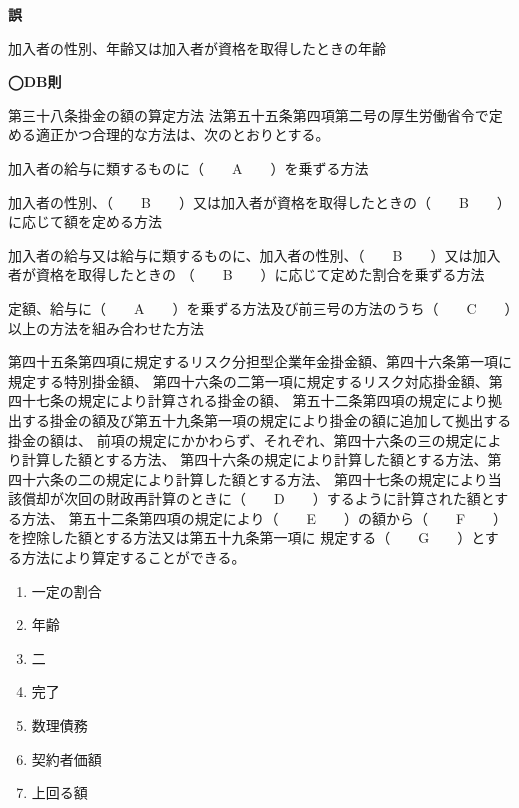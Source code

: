\begin{answerbox}
  \textbf{誤}

  加入者の性別、年齢又は加入者が資格を取得したときの年齢
\end{answerbox}

\begin{fillblank}[数理人試験 2022 問題1 設問2]
  \noindent \textbf{◯DB則}
  \begin{lawstructure}
    \begin{lawarticle}{第三十八条}{掛金の額の算定方法}
      法第五十五条第四項第二号の厚生労働省令で定める適正かつ合理的な方法は、次のとおりとする。

      加入者の給与に類するものに（　　A　　）を乗ずる方法

      加入者の性別、（　　B　　）又は加入者が資格を取得したときの（　　B　　）に応じて額を定める方法

      加入者の給与又は給与に類するものに、加入者の性別、（　　B　　）又は加入者が資格を取得したときの
      （　　B　　）に応じて定めた割合を乗ずる方法

      定額、給与に（　　A　　）を乗ずる方法及び前三号の方法のうち（　　C　　）以上の方法を組み合わせた方法

      第四十五条第四項に規定するリスク分担型企業年金掛金額、第四十六条第一項に規定する特別掛金額、
      第四十六条の二第一項に規定するリスク対応掛金額、第四十七条の規定により計算される掛金の額、
      第五十二条第四項の規定により拠出する掛金の額及び第五十九条第一項の規定により掛金の額に追加して拠出する掛金の額は、
      前項の規定にかかわらず、それぞれ、第四十六条の三の規定により計算した額とする方法、
      第四十六条の規定により計算した額とする方法、第四十六条の二の規定により計算した額とする方法、
      第四十七条の規定により当該償却が次回の財政再計算のときに（　　D　　）するように計算された額とする方法、
      第五十二条第四項の規定により（　　E　　）の額から（　　F　　）を控除した額とする方法又は第五十九条第一項に
      規定する（　　G　　）とする方法により算定することができる。
    \end{lawarticle}
  \end{lawstructure}
\end{fillblank}

\begin{answerbox}
  \begin{enumerate}[A: ]
    \item 一定の割合
    \item 年齢
    \item 二
    \item 完了
    \item 数理債務
    \item 契約者価額
    \item 上回る額
  \end{enumerate}
\end{answerbox}

